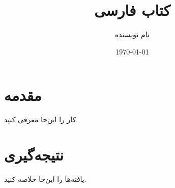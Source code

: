 \documentclass[11pt]{book}
\title{کتاب فارسی}
\author{نام نویسنده}
\date{\today}
\begin{document}
\maketitle
\tableofcontents

\chapter{مقدمه}
کار را این‌جا معرفی کنید.

\chapter{نتیجه‌گیری}
یافته‌ها را این‌جا خلاصه کنید.
\end{document}
